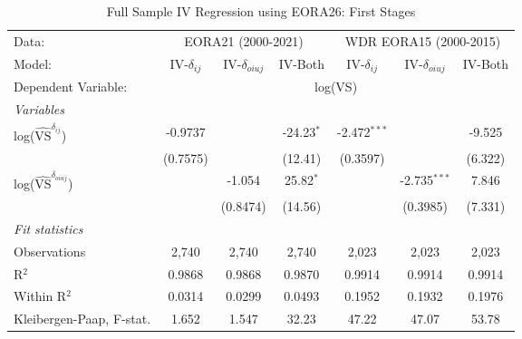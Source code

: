 \documentclass[a4paper]{article}
\begin{document}
\begin{table}[h!]
   \caption{\label{tab:FS_RES_F1} Full Sample IV Regression using EORA26: First Stages}
   \centering
   \begin{tabular}{lcccccc}
      \tabularnewline \toprule
      Data: & \multicolumn{3}{c}{EORA21 (2000-2021)} & \multicolumn{3}{c}{WDR EORA15 (2000-2015)} \\ \cmidrule(lr){2-4} \cmidrule(lr){5-7}
      Model:                   & IV-$\delta_{ij}$      & IV-$\delta_{oiuj}$    & IV-Both              & IV-$\delta_{ij}$      & IV-$\delta_{oiuj}$    & IV-Both\\  
      \midrule
            Dependent Variable: & \multicolumn{6}{c}{log(VS)}\\ \cmidrule(lr){2-7}
      \emph{Variables}\\
      log($\hat{\text{VS}}^{\delta_{ij}}$)        & -0.9737               &                        & -24.23$^{*}$           & -2.472$^{***}$         &                        & -9.525\\   
                                & (0.7575)              &                        & (12.41)                & (0.3597)               &                        & (6.322)\\   
      log($\hat{\text{VS}}^{\delta_{oiuj}}$)             &                       & -1.054                 & 25.82$^{*}$            &                        & -2.735$^{***}$         & 7.846\\   
                                &                       & (0.8474)               & (14.56)                &                        & (0.3985)               & (7.331)\\
      \emph{Fit statistics}\\
      Observations              & 2,740                 & 2,740                  & 2,740                  & 2,023                  & 2,023                  & 2,023\\  
      R$^2$                     & 0.9868                & 0.9868                 & 0.9870                 & 0.9914                 & 0.9914                 & 0.9914\\  
      Within R$^2$              & 0.0314                & 0.0299                 & 0.0493                 & 0.1952                 & 0.1932                 & 0.1976\\  
      Kleibergen-Paap, F-stat.                     & 1.652                 & 1.547                  & 32.23                  & 47.22                  & 47.07                  & 53.78\\   

\end{tabular}
\end{table}
\end{document}
